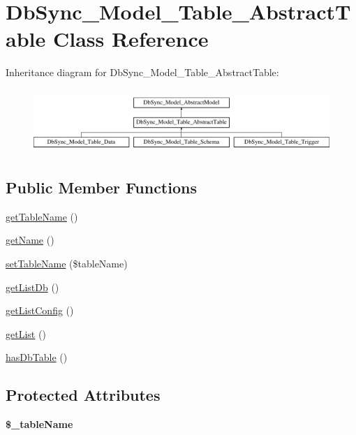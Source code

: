 \hypertarget{classDbSync__Model__Table__AbstractTable}{
\section{DbSync\_\-Model\_\-Table\_\-AbstractTable Class Reference}
\label{classDbSync__Model__Table__AbstractTable}
}
Inheritance diagram for DbSync\_\-Model\_\-Table\_\-AbstractTable:\begin{figure}[H]
\begin{center}
\leavevmode
\includegraphics[height=2.434783cm]{classDbSync__Model__Table__AbstractTable}
\end{center}
\end{figure}
\subsection*{Public Member Functions}
\begin{DoxyCompactItemize}
\item 
\hyperlink{classDbSync__Model__Table__AbstractTable_a8ee4b6ffc0539b45a791bc04eebe7548}{getTableName} ()
\item 
\hyperlink{classDbSync__Model__Table__AbstractTable_a88726b043a43248114ca3e3faa9025d2}{getName} ()
\item 
\hyperlink{classDbSync__Model__Table__AbstractTable_ab72bd2fe433d9ccd5d7e0d0451cc839a}{setTableName} (\$tableName)
\item 
\hyperlink{classDbSync__Model__Table__AbstractTable_abd2ae2adced70abce42204784c057253}{getListDb} ()
\item 
\hyperlink{classDbSync__Model__Table__AbstractTable_ae8ca43e4679f1fd0740ab4dde780609d}{getListConfig} ()
\item 
\hyperlink{classDbSync__Model__Table__AbstractTable_ac9ef882ae4805c341c228290b27ebc2d}{getList} ()
\item 
\hyperlink{classDbSync__Model__Table__AbstractTable_a4823777422da6c8522fac76402e307cd}{hasDbTable} ()
\end{DoxyCompactItemize}
\subsection*{Protected Attributes}
\begin{DoxyCompactItemize}
\item 
\hypertarget{classDbSync__Model__Table__AbstractTable_af53e7af896d208be81a6042724321026}{
{\bfseries \$\_\-tableName}}
\label{classDbSync__Model__Table__AbstractTable_af53e7af896d208be81a6042724321026}

\end{DoxyCompactItemize}


